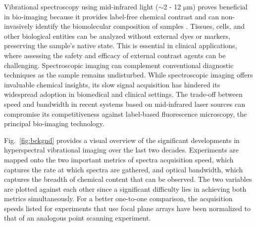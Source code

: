 \documentclass{optica-article}
\begin{document}
Vibrational spectroscopy using mid-infrared light ($\sim$2 - 12 $\mathrm{\mu m}$) proves beneficial in bio-imaging because it provides label-free chemical contrast and can non-invasively identify the biomolecular composition of samples \cite{bakerUsingFourierTransform2014}. Tissues, cells, and other biological entities can be analyzed without external dyes or markers, preserving the sample's native state. This is essential in clinical applications, where assessing the safety and efficacy of external contrast agents can be challenging. Spectroscopic imaging can complement conventional diagnostic techniques as the sample remains undisturbed. While spectroscopic imaging offers invaluable chemical insights, its slow signal acquisition has hindered its widespread adoption in biomedical and clinical settings. The trade-off between speed and bandwidth in recent systems \cite{zhangDepthresolvedMidinfraredPhotothermal2016,koleDiscreteFrequencyInfrared2012,yehFastInfraredChemical2015} based on mid-infrared laser sources can compromise its competitiveness against label-based fluorescence microscopy, the principal bio-imaging technology.

\mbox{Fig. \ref{fig:bckgnd}} provides a visual overview of the significant developments in hyperspectral vibrational imaging over the last two decades. Experiments are mapped onto the two important metrics of spectra acquisition speed, which captures the rate at which spectra are gathered, and optical bandwidth, which captures the breadth of chemical content that can be observed. The two variables are plotted against each other since a significant difficulty lies in achieving both metrics simultaneously. For a better one-to-one comparison, the acquisition speeds listed for experiments that use focal plane arrays have been normalized to that of an analogous point scanning experiment.

\end{document}
